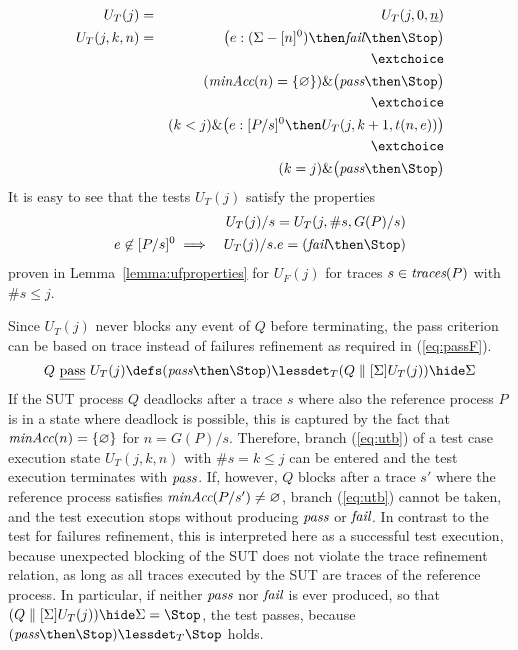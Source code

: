 \begin{eqnarray}
U_T(j) & = & U_T(j,0,\ii n)
\\
U_T(j,k,n) & = & \big(  e:(\Sigma - [n]^0)   \then \efail\then \Stop \big)
\label{eq:uta}
\\ & & \extchoice \nonumber
\\ & & (\minaccs(n) = \{ \varnothing \})   \&   \big( \epass \then \Stop \big)
\label{eq:utb}
\\ & & \extchoice \nonumber
\\ & & (k < j) \& \big( e:[P/s]^0   \then U_T(j,k+1,t(n,e)) \big)
\label{eq:utc}
\\ & & \extchoice \nonumber
\\ & & (k = j) \& \big( \epass\then \Stop  \big)
\label{eq:utd}
\end{eqnarray}
%
It is easy to see that the tests $U_T(j)$ satisfy the properties
\begin{eqnarray}
\label{eq:ifpaT}
  &  & U_T(j)/s = U_T(j,\#s,G(P)/s)
\\
\label{eq:ifpbT}
e\not\in [P/s]^0 & \implies & U_T(j)/s.e = (\efail\then\Stop)
\end{eqnarray}
proven in Lemma~\ref{lemma:ufproperties} for $U_F(j)$ for traces
$s\in\text{\it traces}(P)$ with $\#s \le j$.


Since $U_T(j)$ never blocks any event of $Q$ before terminating, the pass
criterion can be based on trace instead of failures refinement as
required in (\ref{eq:passF}).
%
\begin{equation}
\label{eq:passT}
Q\ \pass\ U_T(j) \defs (\epass\then\Stop) \lessdet_T (Q\parallel[\Sigma] U_T(j)) \hide \Sigma
\end{equation}
%
If the SUT process $Q$ deadlocks after a trace $s$ where also the reference
process $P$ is in a state where deadlock is possible, this is captured by the
fact that $\text{\it minAcc}(n) = \{ \varnothing\}$ for $n = G(P)/s$. Therefore,
branch (\ref{eq:utb}) of a test case execution state $U_T(j,k,n)$ with $\#s =
k \le j$   can be entered and the  test execution terminates with ${\text{\it pass}}$.
If, however, $Q$ blocks after a trace $s'$ where the reference process
satisfies $\text{\it minAcc}(P/s') \neq\varnothing$, branch (\ref{eq:utb})  cannot be
taken, and the test execution stops without producing ${\text{\it pass}}$ or ${\text{\it fail}}$.
In contrast to the test for failures refinement, this is   interpreted here
as a successful test execution, because unexpected blocking of the SUT does
not violate the trace refinement relation, as long as all traces executed by
the SUT are traces of the reference process. In particular, if neither
${\text{\it pass}}$ nor ${\text{\it fail}}$ is ever produced, so that $(Q\parallel[\Sigma] U_T(j))
\hide \Sigma = \Stop$, the test passes, because $(\epass\then\Stop)
\lessdet_T \Stop$ holds.



